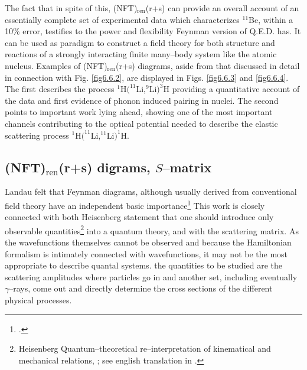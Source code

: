The fact that in spite of this, (NFT)$_{\text{ren}}$(r+s) can provide an overall account of an essentially complete set of experimental data which characterizes $^{11}$Be, within a 10\% error, testifies to the power and flexibility Feynman version of Q.E.D. has. It can be used as paradigm to construct a field theory for both structure and reactions of a strongly interacting finite many--body system like the atomic nucleus. Examples of (NFT)$_{\text{ren}}$(r+s) diagrams, aside from that discussed in detail in connection with Fig. \ref{fig6.6.2}, are displayed in Figs. \ref{fig6.6.3} and \ref{fig6.6.4}. The first describes the process  $^1$H$(^{11}$Li,$^9$Li$)^3$H providing a quantitative account of the data and first evidence of phonon induced pairing in nuclei. The second points to important work lying ahead, showing one of the most important channels contributing to the optical potential needed to describe the elastic scattering process $^1$H$(^{11}$Li,$^{11}$Li$)^1$H.
\subsection{(NFT)$_{\text{ren}}$(r+s) digrams, $S$--matrix}
Landau felt that Feynman diagrams, although usually derived from conventional field theory have an independent basic importance\footnote{\cite{Landau:59}.} This work is closely connected with both Heisenberg statement that one should introduce only observable quantities\footnote{Heisenberg Quantum--theoretical re--interpretation of kinematical and mechanical relations, \cite{Heisenberg:25}; see english translation in \cite{VanderWaerden}.} into a quantum theory, and with the scattering matrix. As the wavefunctions themselves cannot be observed and because the Hamiltonian formalism is intimately connected with wavefunctions, it may not be the most appropriate to describe quantal systems. the quantities to be studied are the scattering amplitudes where particles go in and another set, including eventually $\gamma$--rays, come out and directly determine the cross sections of the different physical processes.



